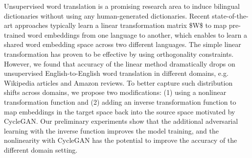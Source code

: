 Unsupervised word translation is a promising research area to induce bilingual dictionaries without using any human-generated dictionaries. Recent state-of-the-art approaches typically learn a linear transformation matrix \$W\$ to map pre-trained word embeddings from one language to another, which enables to learn a shared word embedding space across two different languages. The simple linear transformation has proven to be effective by using orthogonality constraints. However, we found that accuracy of the linear method dramatically drops on unsupervised English-to-English word translation in different domains, e.g. Wikipedia articles and Amazon reviews. To better capture such distribution shifts across domains, we propose two modifications: (1) using a nonlinear transformation function and (2) adding an inverse transformation function to map embeddings in the target space back into the source space motivated by CycleGAN. Our preliminary experiments show that the additional adversarial learning with the inverse function improves the model training, and the nonlinearity with CycleGAN has the potential to improve the accuracy of the different domain setting.
